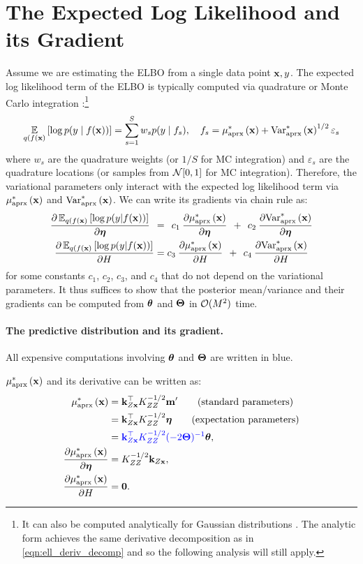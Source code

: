 \section{The Expected Log Likelihood and its Gradient}
Assume we are estimating the ELBO from a single data point $\mathbf{x}, y$.
The expected log likelihood term of the ELBO is typically computed via quadrature or Monte Carlo integration \cite{hensman2015scalable}:\footnote{
  It can also be computed analytically for Gaussian distributions \cite{hensman2013gaussian}.
  The analytic form achieves the same derivative decomposition as in \cref{eqn:ell_deriv_decomp}
  and so the following analysis will still apply.
}
%
\[
  \operatorname*{\mathbb{E}}_{q(f(\mathbf{x})} \left[  \log p(y \mid f(\mathbf{x}))  \right] = \sum_{s=1}^S w_s p(y \mid f_s),
  \quad
  f_s = \mu^*_\text{aprx} \left( \mathbf{x} \right) + \text{Var}^*_\text{aprx} \left( \mathbf{x} \right)^{1/2} \varepsilon_s
\]
%
where $w_s$ are the quadrature weights (or $1/S$ for MC integration) and $\varepsilon_s$ are the quadrature locations (or samples from $\normaldist{0}{1}$ for MC integration).
Therefore, the variational parameters only interact with the expected log likelihood term via $\mu^*_\text{aprx} \left( \mathbf{x} \right)$ and $\text{Var}^*_\text{aprx} \left( \mathbf{x} \right)$.
We can write its gradients via chain rule as:
%
\begin{align}
  \frac{ \partial \operatorname*{\mathbb{E}}_{q(f(\mathbf{x})} \left[  \log p(y | f(\mathbf{x}))  \right]}{\partial \boldsymbol{\eta}}
  \:\: &= \:\:
  c_1 \: \frac{ \partial \mu^*_\text{aprx} \left( \mathbf{x} \right)}{\partial \boldsymbol{\eta}}
  \:\: + \:\:
  c_2 \:  \frac{ \partial \text{Var}^*_\text{aprx} \left( \mathbf{x} \right)}{\partial \boldsymbol{\eta}}
  \nonumber \\
  \frac{ \partial \operatorname*{\mathbb{E}}_{q(f(\mathbf{x})} \left[  \log p(y | f(\mathbf{x}))  \right]}{\partial H}
  &=
  c_3 \: \frac{ \partial \mu^*_\text{aprx} \left( \mathbf{x} \right)}{\partial H}
  \:\: + \:\:
  c_4 \:  \frac{ \partial \text{Var}^*_\text{aprx} \left( \mathbf{x} \right)}{\partial H}
  \label{eqn:ell_deriv_decomp}
\end{align}
%
for some constants $c_1$, $c_2$, $c_3$, and $c_4$ that do not depend on the variational parameters.
It thus suffices to show that the posterior mean/variance and their gradients can be computed from $\boldsymbol{\theta}$ and $\boldsymbol{\Theta}$ in $\bigo{M^2}$ time.

\paragraph{The predictive distribution and its gradient.}
All expensive computations involving $\boldsymbol{\theta}$ and $\boldsymbol{\Theta}$ are written in {\color{blue} blue}.

$\mu^*_\text{aprx} \left( \mathbf{x} \right)$ and its derivative can be written as:
%
\begin{align}
  \mu^*_\text{aprx} \left( \mathbf{x} \right)
  &= \mathbf{k}_{Z \mathbf{x}}^\top K_{ZZ}^{-1/2} \mathbf{m}'
  \tag{standard parameters} \\
  &= \mathbf{k}_{Z \mathbf{x}}^\top K_{ZZ}^{-1/2} \boldsymbol{\eta}
  \tag{expectation parameters} \\
  &= {\color{blue} \mathbf{k}_{Z \mathbf{x}}^\top K_{ZZ}^{-1/2} (-2 \boldsymbol{\Theta})^{-1}} \boldsymbol{\theta}
  \label{eqn:pred_mean_natural},
  \\
  \frac{\partial \mu^*_\text{aprx} \left( \mathbf{x} \right)}{\partial \boldsymbol{\eta}}
  &= K_{ZZ}^{-1/2} \mathbf{k}_{Z \mathbf{x}}
  \label{eqn:pred_mean_deriv},
  \\
  \frac{\partial \mu^*_\text{aprx} \left( \mathbf{x} \right)}{\partial H}
  &= \mathbf{0}.
  \nonumber
\end{align}


